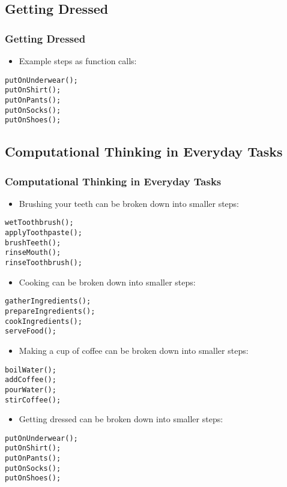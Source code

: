 \subsection{Getting Dressed}
\begin{frame}[fragile]
\frametitle{Getting Dressed}
\begin{itemize}
    \item Example steps as function calls:
\end{itemize}
\begin{lstlisting}
putOnUnderwear();
putOnShirt();
putOnPants();
putOnSocks();
putOnShoes();
\end{lstlisting}
\end{frame}

\subsection{Computational Thinking in Everyday Tasks}
\begin{frame}[fragile]
\frametitle{Computational Thinking in Everyday Tasks}
\begin{itemize}
    \item Brushing your teeth can be broken down into smaller steps:
\end{itemize}
\begin{lstlisting}
wetToothbrush();
applyToothpaste();
brushTeeth();
rinseMouth();
rinseToothbrush();
\end{lstlisting}
\begin{itemize}
    \item Cooking can be broken down into smaller steps:
\end{itemize}
\begin{lstlisting}
gatherIngredients();
prepareIngredients();
cookIngredients();
serveFood();
\end{lstlisting}
\begin{itemize}
    \item Making a cup of coffee can be broken down into smaller steps:
\end{itemize}
\begin{lstlisting}
boilWater();
addCoffee();
pourWater();
stirCoffee();
\end{lstlisting}
\begin{itemize}
    \item Getting dressed can be broken down into smaller steps:
\end{itemize}
\begin{lstlisting}
putOnUnderwear();
putOnShirt();
putOnPants();
putOnSocks();
putOnShoes();
\end{lstlisting}
\end{frame}
